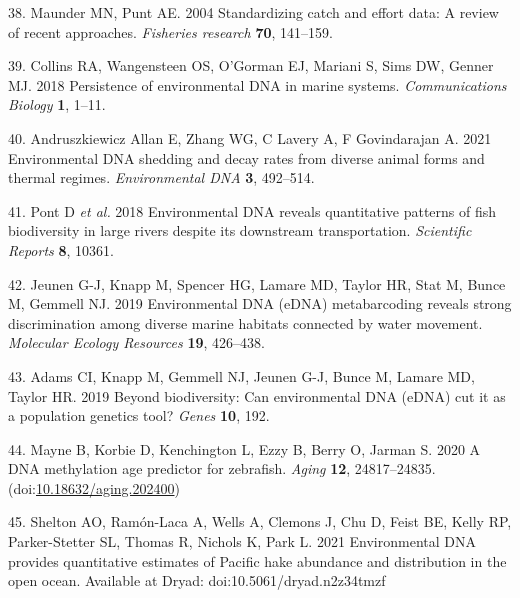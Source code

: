 \documentclass[
]{article}
\begin{document}
\leavevmode\hypertarget{ref-maunder2004standardizing}{}%
38. Maunder MN, Punt AE. 2004 Standardizing catch and effort data: A
review of recent approaches. \emph{Fisheries research} \textbf{70},
141--159.

\leavevmode\hypertarget{ref-collins2018persistence}{}%
39. Collins RA, Wangensteen OS, O'Gorman EJ, Mariani S, Sims DW, Genner
MJ. 2018 Persistence of environmental DNA in marine systems.
\emph{Communications Biology} \textbf{1}, 1--11.

\leavevmode\hypertarget{ref-andruszkiewicz2021environmental}{}%
40. Andruszkiewicz Allan E, Zhang WG, C Lavery A, F Govindarajan A. 2021
Environmental DNA shedding and decay rates from diverse animal forms and
thermal regimes. \emph{Environmental DNA} \textbf{3}, 492--514.

\leavevmode\hypertarget{ref-pont2018environmental}{}%
41. Pont D \emph{et al.} 2018 Environmental DNA reveals quantitative
patterns of fish biodiversity in large rivers despite its downstream
transportation. \emph{Scientific Reports} \textbf{8}, 10361.

\leavevmode\hypertarget{ref-jeunen2019environmental}{}%
42. Jeunen G-J, Knapp M, Spencer HG, Lamare MD, Taylor HR, Stat M, Bunce
M, Gemmell NJ. 2019 Environmental DNA (eDNA) metabarcoding reveals
strong discrimination among diverse marine habitats connected by water
movement. \emph{Molecular Ecology Resources} \textbf{19}, 426--438.

\leavevmode\hypertarget{ref-adams2019beyond}{}%
43. Adams CI, Knapp M, Gemmell NJ, Jeunen G-J, Bunce M, Lamare MD,
Taylor HR. 2019 Beyond biodiversity: Can environmental DNA (eDNA) cut it
as a population genetics tool? \emph{Genes} \textbf{10}, 192.

\leavevmode\hypertarget{ref-mayne2020aging}{}%
44. Mayne B, Korbie D, Kenchington L, Ezzy B, Berry O, Jarman S. 2020 A
DNA methylation age predictor for zebrafish. \emph{Aging} \textbf{12},
24817--24835.
(doi:\href{https://doi.org/10.18632/aging.202400}{10.18632/aging.202400})

\leavevmode\hypertarget{ref-shelton2021data}{}%
45. Shelton AO, Ram\'on-Laca A, Wells A, Clemons J, Chu D, Feist BE, Kelly RP,
Parker-Stetter SL, Thomas R, Nichols K, Park L. 2021 Environmental DNA provides 
quantitative estimates of Pacific hake abundance and distribution in the open ocean. Available at Dryad:
doi:10.5061/dryad.n2z34tmzf
\end{document}
